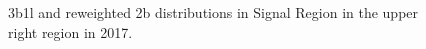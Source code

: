 \begin{figure}[ht]
 
 
    \caption{3b1l and reweighted 2b distributions in Signal Region in the upper right region in 2017.}
    \label{fig:upper-right-3b1l-SR-2017}
\end{figure}


